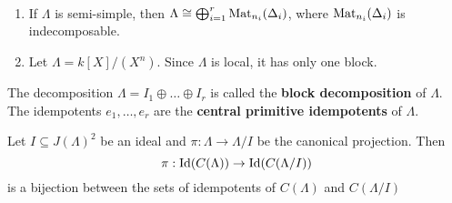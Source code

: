 
\begin{example}\
\begin{enumerate}
\item If $\Lambda$ is semi-simple, then $\Lambda \cong \bigoplus_{i=1}^r \operatorname{Mat}_{n_i}(\Delta_i)$, where $\operatorname{Mat}_{n_i}(\Delta_i)$ is indecomposable.
\item Let $\Lambda=k[X]/(X^n)$. Since $\Lambda$ is local, it has only one block.
\end{enumerate}
\end{example}


\begin{definition}
The decomposition $\Lambda=I_1\oplus \dots\oplus I_r$ is called the \textbf{block decomposition} of $\Lambda$. The idempotents $e_1,\dots,e_r$ are the \textbf{central primitive idempotents} of $\Lambda$.
\end{definition}


\begin{proposition}\label{1.6.2}
Let $I\subseteq J(\Lambda)^2$ be an ideal and $\pi:\Lambda\to\Lambda/I$ be the canonical projection. Then
\[
\pi: \operatorname{Id}(C(\Lambda)) \to \operatorname{Id}(C(\Lambda/I))
\]
is a bijection between the sets of idempotents of $C(\Lambda)$ and $C(\Lambda/I)$
\end{proposition}


